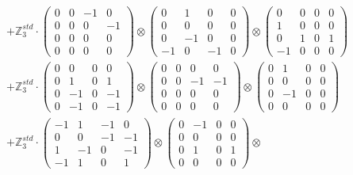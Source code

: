 \documentclass{article}
\begin{document}
{\begin{align}
        &+ \label{Rs16-Rc11-Solution-3-c22} \mathbb{Z}_3^{std} \cdot 
            \begin{pmatrix} 0 & 0 & -1 & 0 \\ 0 & 0 & 0 & -1 \\ 0 & 0 & 0 & 0 \\ 0 & 0 & 0 & 0 \end{pmatrix} \otimes 
            \begin{pmatrix} 0 & 1 & 0 & 0 \\ 0 & 0 & 0 & 0 \\ 0 & -1 & 0 & 0 \\ -1 & 0 & -1 & 0 \end{pmatrix} \otimes 
            \begin{pmatrix} 0 & 0 & 0 & 0 \\ 1 & 0 & 0 & 0 \\ 0 & 1 & 0 & 1 \\ -1 & 0 & 0 & 0 \end{pmatrix} \\ 
        &+ \label{Rs16-Rc11-Solution-3-c23} \mathbb{Z}_3^{std} \cdot 
            \begin{pmatrix} 0 & 0 & 0 & 0 \\ 0 & 1 & 0 & 1 \\ 0 & -1 & 0 & -1 \\ 0 & -1 & 0 & -1 \end{pmatrix} \otimes 
            \begin{pmatrix} 0 & 0 & 0 & 0 \\ 0 & 0 & -1 & -1 \\ 0 & 0 & 0 & 0 \\ 0 & 0 & 0 & 0 \end{pmatrix} \otimes 
            \begin{pmatrix} 0 & 1 & 0 & 0 \\ 0 & 0 & 0 & 0 \\ 0 & -1 & 0 & 0 \\ 0 & 0 & 0 & 0 \end{pmatrix} \\ 
        &+ \label{Rs16-Rc11-Solution-3-c24} \mathbb{Z}_3^{std} \cdot 
            \begin{pmatrix} -1 & 1 & -1 & 0 \\ 0 & 0 & -1 & -1 \\ 1 & -1 & 0 & -1 \\ -1 & 1 & 0 & 1 \end{pmatrix} \otimes 
            \begin{pmatrix} 0 & -1 & 0 & 0 \\ 0 & 0 & 0 & 0 \\ 0 & 1 & 0 & 1 \\ 0 & 0 & 0 & 0 \end{pmatrix} \otimes 

\end{align}}
\end{document}
